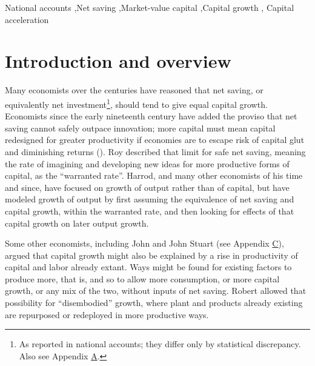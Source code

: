\documentclass[a4paper,fleqn]{latex_styles/cas-sc}
\begin{document}

\begin{keywords}
National accounts \sep Net
saving \sep Market-value capital \sep Capital
growth \sep 
Capital acceleration

\end{keywords}

\maketitle

\hypertarget{introduction}{%
\section{Introduction and overview}\label{introduction}}

Many economists over the centuries have reasoned that net saving, or equivalently net investment\footnote{As reported in national accounts; they differ only by statistical discrepancy. Also see Appendix \hyperref[appendix-a]{A}.}, should tend to give equal capital growth. Economists since the early
nineteenth century have added the proviso that net saving cannot
safely outpace innovation; more capital must mean capital redesigned for
greater productivity if economies are to escape risk of capital glut and
diminishing returns
(\citet{westEssayApplicationCapital1815, ricardoEssayProfitsVol1815, malthusEnquiryNatureProgress1815}).
Roy \citet{harrodEssayDynamicTheory1939}
described that limit for safe net saving, meaning the rate of
imagining and developing new ideas for more productive forms of capital,
as the ``warranted rate''. Harrod, and many other economists of his time
and since, have focused on growth of output rather than of capital, but
have modeled growth of output by first assuming the equivalence of net
saving and capital growth, within the warranted rate, and then
looking for effects of that capital growth on later output growth.

Some other economists, including John  \citet{raeNewPrinciplesPolitical1834} and John Stuart 
\citet{millPrinciplesPoliticalEconomy1848} (see Appendix \hyperref[appendix-c]{C}), argued that capital growth might also be explained
by a rise in productivity of capital and labor already extant. Ways
might be found for existing factors to produce more, that is, and so to
allow more consumption, or more capital growth, or any mix of the two,
without inputs of net saving. Robert
\citet{solowTECHNICALCHANGEAGGREGATE1957} allowed that possibility for
``disembodied'' growth, where plant and products already existing are
repurposed or redeployed in more productive ways.
\end{document}
